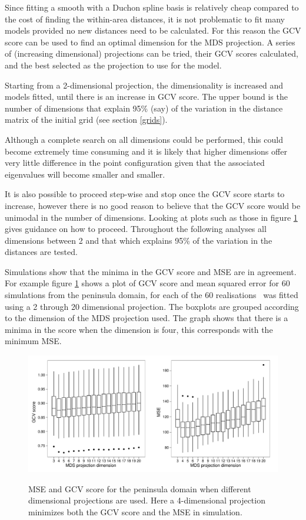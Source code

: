 Since fitting a smooth with a Duchon spline basis is relatively cheap compared to the cost of finding the within-area distances, it is not problematic to fit many models provided no new distances need to be calculated. For this reason the GCV score can be used to find an optimal dimension for the MDS projection. A series of (increasing dimensional) projections can be tried, their GCV scores calculated, and the best selected as the projection to use for the model.

Starting from a 2-dimensional projection, the dimensionality is increased and models fitted, until there is an increase in GCV score. The upper bound is the number of dimensions that explain 95\% (say) of the variation in the distance matrix of the initial grid (see section \ref{grids}).  

Although a complete search on all dimensions could be performed, this could become extremely time consuming and it is likely that higher dimensions offer very little difference in the point configuration given that the associated eigenvalues will become smaller and smaller.

It is also possible to proceed step-wise and stop once the GCV score starts to increase, however there is no good reason to believe that the GCV score would be unimodal in the number of dimensions. Looking at plots such as those in figure \ref{wt2-gcv-projdim-boxplot} gives guidance on how to proceed. Throughout the following analyses all dimensions between 2 and that which explains 95\% of the variation in the distances are tested.

Simulations show that the minima in the GCV score and MSE are in agreement. For example figure \ref{wt2-gcv-projdim-boxplot} shows a plot of GCV score and mean squared error for 60 simulations from the peninsula domain, for each of the 60 realisations \mdsds\ was fitted using a 2 through 20 dimensional projection. The boxplots are grouped according to the dimension of the MDS projection used. The graph shows that there is a minima in the score when the dimension is four, this corresponds with the minimum MSE.

\begin{figure}
\centering
\includegraphics[width=6in]{mds/figs/wt2-gcv-projdim-boxplot.pdf} \\
\caption{MSE and GCV score for the peninsula domain when different dimensional projections are used. Here a 4-dimensional projection minimizes both the GCV score and the MSE in simulation.}
\label{wt2-gcv-projdim-boxplot}
\end{figure}

